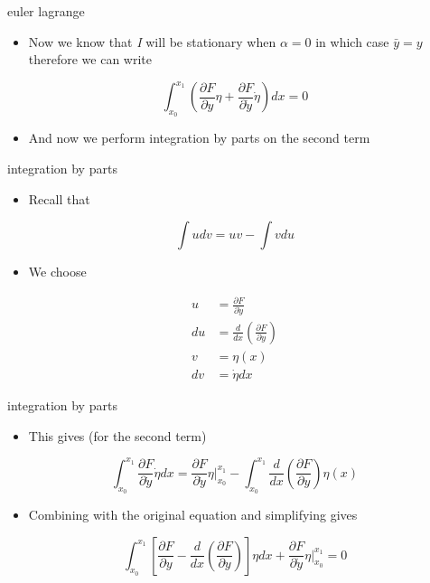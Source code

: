 \documentclass[
  letterpaper,
  ignorenonframetext,
  aspectratio=43,
  handout,
  12pt]{beamer}
\providecommand{\tightlist}{%
  \setlength{\itemsep}{0pt}\setlength{\parskip}{0pt}}
\providecommand{\tightlist}{%
\setlength{\itemsep}{0pt}\setlength{\parskip}{0pt}}
\begin{document}
\begin{frame}{euler lagrange}
\protect\hypertarget{euler-lagrange-5}{}
\begin{itemize}
\tightlist
\item
  Now we know that \emph{I} will be stationary when \(\alpha = 0\) in
  which case \(\bar{y}=y\) therefore we can write
\end{itemize}

\[\int_{x_0}^{x_1} \left ( \frac{\partial F}{\partial y}\eta  +
  \frac{\partial F}{\partial \dot{y}}\dot{\eta}\right )dx = 0\]

\begin{itemize}
\tightlist
\item
  And now we perform integration by parts on the second term
\end{itemize}
\end{frame}

\begin{frame}{integration by parts}
\protect\hypertarget{integration-by-parts}{}
\begin{itemize}
\tightlist
\item
  Recall that
\end{itemize}

\[\int u dv = uv - \int v du\]

\begin{itemize}
\tightlist
\item
  We choose
\end{itemize}

\[\begin{aligned}
  u &= \frac{\partial F}{\partial \dot{y}}\\
  du &= \frac{d}{dx} \left( \frac{\partial F}{\partial y} \right)\\
  v &= \eta(x)\\
  dv &= \dot{\eta} dx
\end{aligned}\]
\end{frame}

\begin{frame}{integration by parts}
\protect\hypertarget{integration-by-parts-1}{}
\begin{itemize}
\tightlist
\item
  This gives (for the second term)
\end{itemize}

\[\int_{x_0}^{x_1} \frac{\partial F}{\partial \dot{y}}\dot{\eta} dx = \frac{\partial F}{\partial \dot{y}}\eta |_{x_0}^{x_1} - \int_{x_0}^{x_1} \frac{d}{dx} \left( \frac{\partial F}{\partial y} \right) \eta(x)\]

\begin{itemize}
\tightlist
\item
  Combining with the original equation and simplifying gives
\end{itemize}

\[\int_{x_0}^{x_1} \left [ \frac{\partial F}{\partial y} - \frac{d}{dx} \left( \frac{\partial F}{\partial y} \right) \right ]\eta dx + \frac{\partial F}{\partial \dot{y}}\eta |_{x_0}^{x_1} = 0\]
\end{frame}
\end{document}
